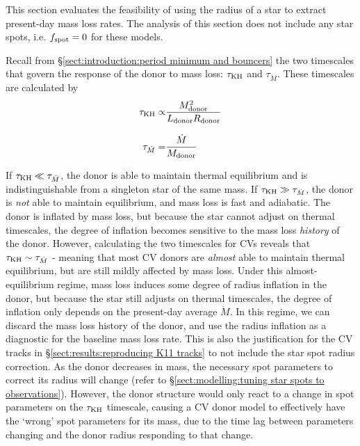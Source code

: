This section evaluates the feasibility of using the radius of a star to extract present-day mass loss rates.
The analysis of this section does not include any star spots, i.e. $f_{\rm spot} = 0$ for these models.

Recall from \S\ref{sect:introduction:period minimum and bouncers} the two timescales that govern the response of the donor to mass loss: $\tau_{\rm KH}$ and $\tau_{\dot M}$. These timescales are calculated by
\begin{align}
    \tau_{\rm KH} \propto& \frac{M_{\rm donor}^2}{L_{\rm donor} R_{\rm donor}} \\[8pt]
    \tau_{\dot M} =& \frac{\dot M}{M_{\rm donor}}
\end{align}

If $\tau_{\rm KH} \ll \tau_{\dot M}$, the donor is able to maintain thermal equilibrium and is indistinguishable from a singleton star of the same mass.
If $\tau_{\rm KH} \gg \tau_{\dot M}$, the donor is \textit{not} able to maintain equilibrium, and mass loss is fast and adiabatic. The donor is inflated by mass loss, but because the star cannot adjust on thermal timescales, the degree of inflation becomes sensitive to the mass loss \textit{history} of the donor.
However, calculating the two timescales for CVs reveals that $\tau_{\rm KH} \sim \tau_{\dot M}$ \citep{knigge11} - meaning that most CV donors are \textit{almost} able to maintain thermal equilibrium, but are still mildly affected by mass loss.
Under this almost-equilibrium regime, mass loss induces some degree of radius inflation in the donor, but because the star still adjusts on thermal timescales, the degree of inflation only depends on the present-day average $\dot M$. In this regime, we can discard the mass loss history of the donor, and use the radius inflation as a diagnostic for the baseline mass loss rate.
This is also the justification for the CV tracks in \S\ref{sect:results:reproducing K11 tracks} to not include the star spot radius correction. As the donor decreases in mass, the necessary spot parameters to correct its radius will change (refer to \S\ref{sect:modelling:tuning star spots to observations}). However, the donor structure would only react to a change in spot parameters on the $\tau_{\rm KH}$ timescale, causing a CV donor model to effectively have the `wrong' spot parameters for its mass, due to the time lag between parameters changing and the donor radius responding to that change.


